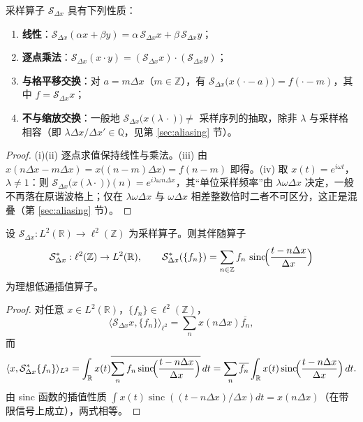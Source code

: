 \begin{proposition}[采样算子的代数性质]\label{prop:sampling_algebra_parallel}
采样算子 $\mathcal{S}_{\Delta x}$ 具有下列性质：
\begin{enumerate}[label=(\roman*)]
    \item \textbf{线性}：$\mathcal{S}_{\Delta x}(\alpha x+\beta y)=\alpha\,\mathcal{S}_{\Delta x}x+\beta\,\mathcal{S}_{\Delta x}y$；
    \item \textbf{逐点乘法}：$\mathcal{S}_{\Delta x}(x\cdot y)=(\mathcal{S}_{\Delta x}x)\cdot(\mathcal{S}_{\Delta x}y)$；
    \item \textbf{与格平移交换}：对 $a=m\Delta x$（$m\in\mathbb{Z}$），有 $\mathcal{S}_{\Delta x}\big(x(\cdot-a)\big)=f(\cdot-m)$，其中 $f=\mathcal{S}_{\Delta x}x$；
    \item \textbf{不与缩放交换}：一般地 $\mathcal{S}_{\Delta x}\big(x(\lambda\,\cdot)\big)\neq$ 采样序列的抽取，除非 $\lambda$ 与采样格相容（即 $\lambda\Delta x/\Delta x'\in\mathbb{Q}$，见第 \ref{sec:aliasing} 节）。
\end{enumerate}
\end{proposition}

\begin{proof}
(i)(ii) 逐点求值保持线性与乘法。(iii) 由 $x(n\Delta x-m\Delta x)=x\big((n-m)\Delta x\big)=f(n-m)$ 即得。(iv) 取 $x(t)=e^{i\omega t}$，$\lambda\ne1$：则 $\mathcal{S}_{\Delta x}\big(x(\lambda\cdot)\big)(n)=e^{i\lambda\omega n\Delta x}$，其“单位采样频率”由 $\lambda\omega\Delta x$ 决定，一般不再落在原谐波格上；仅在 $\lambda\omega\Delta x$ 与 $\omega\Delta x$ 相差整数倍时二者不可区分，这正是混叠（第 \ref{sec:aliasing} 节）。
\end{proof}

\begin{property}[采样算子的伴随]\label{prop:sampling_adjoint}
设 $\mathcal{S}_{\Delta x}:L^2(\mathbb{R})\to\ell^2(\mathbb{Z})$ 为采样算子。则其伴随算子
\[
\mathcal{S}_{\Delta x}^*:\ell^2(\mathbb{Z})\to L^2(\mathbb{R}),
\qquad
\mathcal{S}_{\Delta x}^*(\{f_n\}) = \sum_{n\in\mathbb{Z}}f_n\,\operatorname{sinc}\!\Bigl(\frac{t-n\Delta x}{\Delta x}\Bigr)
\]
为理想低通插值算子。
\end{property}

\begin{proof}
对任意 $x\in L^2(\mathbb{R})$，$\{f_n\}\in\ell^2(\mathbb{Z})$，
\[
\langle \mathcal{S}_{\Delta x}x,\{f_n\}\rangle_{\ell^2}=\sum_n x(n\Delta x)\overline{f_n},
\]
而
\[
\langle x,\mathcal{S}_{\Delta x}^*\{f_n\}\rangle_{L^2}=\int_{\mathbb{R}}x(t)\overline{\sum_n f_n\operatorname{sinc}\!\Bigl(\frac{t-n\Delta x}{\Delta x}\Bigr)}\,dt
=\sum_n\overline{f_n}\int_{\mathbb{R}}x(t)\operatorname{sinc}\!\Bigl(\frac{t-n\Delta x}{\Delta x}\Bigr)\,dt.
\]
由 sinc 函数的插值性质 $\int x(t)\operatorname{sinc}((t-n\Delta x)/\Delta x)dt=x(n\Delta x)$（在带限信号上成立），两式相等。
\end{proof}

